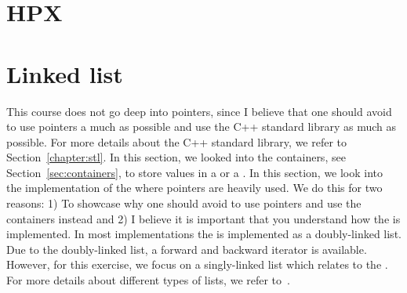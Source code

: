 \documentclass[11pt,fleqn]{book} %
\begin{document}



\part{HPX}
\label{sec:hpx}



\part{Linked list}

This course does not go deep into pointers, since I believe that one should avoid to use pointers a much as possible and use the C++ standard library as much as possible. For more details about the C++ standard library, we refer to Section~\ref{chapter:stl}. In this section, we looked into the containers, see Section~\ref{sec:containers}, to store values in a  or a . In this section, we look into the implementation of the  where pointers are heavily used. We do this for two reasons: 1) To showcase why one should avoid to use pointers and use the containers instead and 2) I believe it is important that you understand how the  is implemented. In most implementations the  is implemented as a doubly-linked list. Due to the doubly-linked list, a forward and backward iterator is available. However, for this exercise, we focus on a singly-linked list which relates to the . For more details about different types of lists, we refer to~\cite{abelson1996structure}. \\
\end{document}
